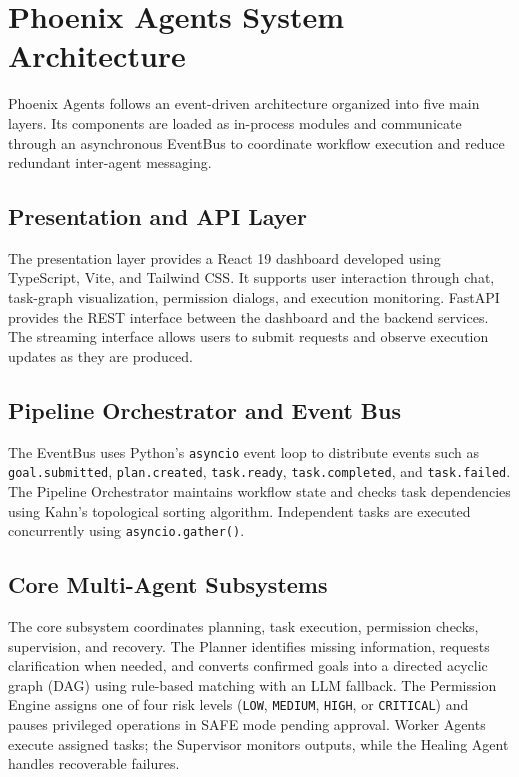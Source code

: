 \documentclass[conference]{IEEEtran}
\begin{document}
\section{Phoenix Agents System Architecture}

Phoenix Agents follows an event-driven architecture organized into five main layers. Its components are loaded as in-process modules and communicate through an asynchronous EventBus to coordinate workflow execution and reduce redundant inter-agent messaging.

\subsection{Presentation and API Layer}

The presentation layer provides a React 19 dashboard developed using TypeScript, Vite, and Tailwind CSS. It supports user interaction through chat, task-graph visualization, permission dialogs, and execution monitoring. FastAPI provides the REST interface between the dashboard and the backend services. The streaming interface allows users to submit requests and observe execution updates as they are produced.

\subsection{Pipeline Orchestrator and Event Bus}

The EventBus uses Python's \texttt{asyncio} event loop to distribute events such as \texttt{goal.submitted}, \texttt{plan.created}, \texttt{task.ready}, \texttt{task.completed}, and \texttt{task.failed}. The Pipeline Orchestrator maintains workflow state and checks task dependencies using Kahn's topological sorting algorithm. Independent tasks are executed concurrently using \texttt{asyncio.gather()}.

\subsection{Core Multi-Agent Subsystems}

The core subsystem coordinates planning, task execution, permission checks, supervision, and recovery. The Planner identifies missing information, requests clarification when needed, and converts confirmed goals into a directed acyclic graph (DAG) using rule-based matching with an LLM fallback. The Permission Engine assigns one of four risk levels (\texttt{LOW}, \texttt{MEDIUM}, \texttt{HIGH}, or \texttt{CRITICAL}) and pauses privileged operations in SAFE mode pending approval. Worker Agents execute assigned tasks; the Supervisor monitors outputs, while the Healing Agent handles recoverable failures.
\end{document}
